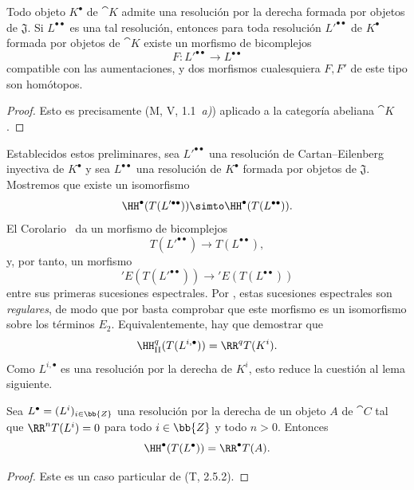\documentclass[oneside]{amsart}
\newcommand{\oldpage}[2][]{{\marginnote{\normalfont\textbf{#1}~|~#2}}\ignorespaces}
\let\EGAOriginalLabel\label
\renewcommand{\label}[1]{\phantomsection\EGAOriginalLabel{#1}}
\begin{document}
\begin{corollary}[11.5.2.2]
\label{0.11.5.2.2}
Todo objeto $K^\bullet$ de $\cat{K}$ admite una resolución por la derecha formada por objetos de $\mathfrak{J}$.
Si $L^{\bullet\bullet}$ es una tal resolución, entonces para toda resolución $L'^{\bullet\bullet}$ de $K^\bullet$ formada por objetos de $\cat{K}$ existe un morfismo de bicomplejos
\[
  F:L'^{\bullet\bullet}\longrightarrow L^{\bullet\bullet}
\]
compatible con las aumentaciones, y dos morfismos cualesquiera $F,F'$ de este tipo son homótopos.
\end{corollary}

\begin{proof}
Esto es precisamente (M, V, 1.1~\emph{a)}) aplicado a la categoría abeliana $\cat{K}$.
\end{proof}

\begin{env}[11.5.2.3]
\label{0.11.5.2.3}
Establecidos estos preliminares, sea $L'^{\bullet\bullet}$ una resolución de Cartan--Eilenberg inyectiva de $K^\bullet$ y sea $L^{\bullet\bullet}$ una resolución de $K^\bullet$ formada por objetos de $\mathfrak{J}$.
Mostremos que existe un isomorfismo
\[
  \HH^\bullet(T(L'^{\bullet\bullet}))
  \simto
  \HH^\bullet(T(L^{\bullet\bullet})).
\]
El Corolario~ da un morfismo de bicomplejos
\[
  T(L'^{\bullet\bullet})\longrightarrow T(L^{\bullet\bullet}),
\]
y, por tanto, un morfismo
\[
  'E(T(L'^{\bullet\bullet}))\longrightarrow{}'E(T(L^{\bullet\bullet}))
\]
entre sus primeras sucesiones espectrales.
Por , estas sucesiones espectrales son \emph{regulares}, de modo que por  basta comprobar que este morfismo es un isomorfismo sobre los términos $E_2$.
Equivalentemente, hay que demostrar que
\[
  \HH_\mathrm{II}^q(T(L^{i,\bullet}))=\RR^qT(K^i).
\]
Como $L^{i,\bullet}$ es una resolución por la derecha de $K^i$, esto reduce la cuestión al lema siguiente.
\end{env}

\oldpage[0\textsubscript{III}]{38}
\begin{lemma}[11.5.2.4]
\label{0.11.5.2.4}
Sea $L^\bullet=(L^i)_{i\in\bb{Z}}$ una resolución por la derecha de un objeto $A$ de $\cat{C}$ tal que $\RR^nT(L^i)=0$ para todo $i\in\bb{Z}$ y todo $n>0$.
Entonces
\[
  \HH^\bullet(T(L^\bullet))=\RR^\bullet T(A).
\]
\end{lemma}

\begin{proof}
Este es un caso particular de (T, 2.5.2).
\end{proof}
\end{document}
